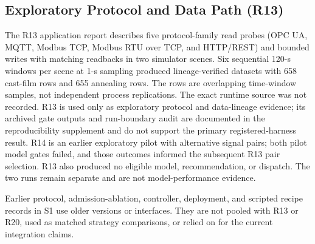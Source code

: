 \subsection{Exploratory Protocol and Data Path (R13)}
\label{sec:crossscene}
The R13 application report describes five protocol-family read probes (OPC UA,
MQTT, Modbus TCP, Modbus RTU over TCP, and HTTP/REST) and bounded writes with
matching readbacks in two simulator scenes. Six sequential 120-s windows per
scene at 1-s sampling produced lineage-verified datasets with 658 cast-film
rows and 655 annealing rows. The rows are overlapping time-window samples, not
independent process replications. The exact runtime source was not recorded. R13 is
used only as exploratory protocol and data-lineage evidence; its archived gate
outputs and run-boundary audit are documented in the reproducibility
supplement and do not support the primary registered-harness result.
R14 is an earlier exploratory pilot with alternative signal pairs; both pilot
model gates failed, and those outcomes informed the subsequent R13 pair
selection. R13 also produced no eligible model, recommendation, or dispatch.
The two runs remain separate and are not model-performance evidence.

Earlier protocol, admission-ablation, controller, deployment, and scripted
recipe records in S1 use older versions or interfaces. They are not pooled
with R13 or R20, used as matched strategy comparisons, or relied on for the
current integration claims.
